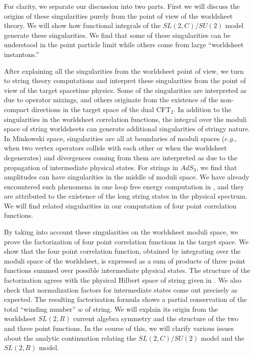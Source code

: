 For clarity, we separate our discussion into
two parts. First we will discuss the origins of these
singularities purely from the point of view of the
worldsheet theory. We will show how functional integrals
of the $SL(2,C)/SU(2)$ model generate these singularities.
We find that some of these singularities can be understood in the
point particle limit while others come from
 large ``worldsheet instantons.''

After explaining all the singularities from the worldsheet
point of view, we turn to string theory computations
and interpret these singularities from the point of view
of the target spacetime physics. Some of the singularities
are interpreted as due to operator mixings, and others
originate from the existence of the non-compact directions
in the target space of the dual CFT$_2$. In addition to
the singularities in the worldsheet correlation functions,
the integral over the moduli space of string worldsheets can
generate additional singularities of stringy nature.
In Minkowski space, singularities are all at boundaries
of moduli spaces ($e.g.$, when two vertex operators collide
with each other or when the worldsheet degenerates) and
divergences coming from them are interpreted as due
to the  propagation of intermediate physical states.
For strings in $AdS_3$, we find that amplitudes
can have singularities in the middle of moduli space. We
have already encountered such phenomena in one loop free
energy computation in \second, and they are attributed to
the existence of the long string states in the physical
spectrum. We will find related singularities in our computation
of four point correlation functions.

By taking into account these singularities on the worldsheet
moduli space, we prove the factorization of four point
correlation functions in the target space. We show that
the four point correlation function,
obtained by  integrating over the moduli space of the worldsheet,
is expressed as a sum of products of three point functions
summed over possible intermediate physical states.
The structure of the factorization agrees with the
physical Hilbert space of string given in .
We also check that normalization factors for
intermediate states come  out  precisely as expected.
The resulting factorization formula
shows a partial conservation of the total ``winding number''
$w$ of string.
 We will explain its origin from  the worldsheet
$SL(2,R)$ current algebra symmetry and the structure
of the two and three point functions.
In the course of this, we will
clarify various issues about the analytic continuation relating
the $SL(2,C)/SU(2)$ model and the $SL(2,R)$ model.

